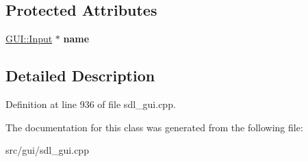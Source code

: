\subsection*{Protected Attributes}
\begin{DoxyCompactItemize}
\item 
\hypertarget{classSaveLangDialog_aac396e13fdd8c3784b2c85e1d23adcd3}{\hyperlink{classGUI_1_1Input}{G\-U\-I\-::\-Input} $\ast$ {\bfseries name}}\label{classSaveLangDialog_aac396e13fdd8c3784b2c85e1d23adcd3}

\end{DoxyCompactItemize}


\subsection{Detailed Description}


Definition at line 936 of file sdl\-\_\-gui.\-cpp.



The documentation for this class was generated from the following file\-:\begin{DoxyCompactItemize}
\item 
src/gui/sdl\-\_\-gui.\-cpp\end{DoxyCompactItemize}
